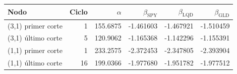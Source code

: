 {\small
\begin{tabular}{lrrrrr}
\toprule
Nodo & Ciclo & $\alpha$ & $\beta_{\mathrm{SPY}}$ & $\beta_{\mathrm{LQD}}$ & $\beta_{\mathrm{GLD}}$ \\
\midrule
(3,1) primer corte & 1 & 155.6875 & -1.461603 & -1.467921 & -1.510459 \\
(3,1) último corte & 5 & 120.9062 & -1.165368 & -1.142296 & -1.155391 \\
(1,1) primer corte & 1 & 233.2575 & -2.372453 & -2.347805 & -2.393904 \\
(1,1) último corte & 16 & 199.0366 & -1.977680 & -1.951782 & -1.977512 \\
\bottomrule
\end{tabular}
}
